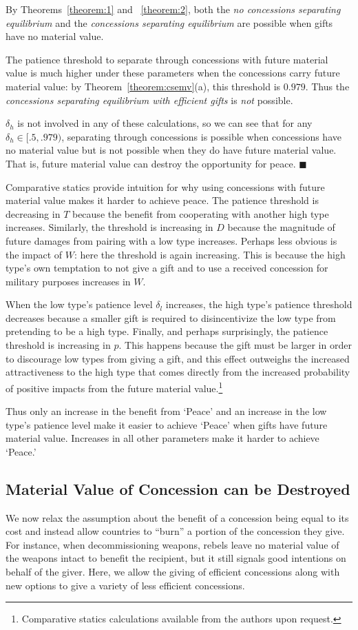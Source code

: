 \documentclass[12pt, letterpaper]{article}
\newcommand{\de}{\delta}
\begin{document}
By Theorems~\ref{theorem:1} and ~\ref{theorem:2}, both the \emph{no concessions separating equilibrium} and the \emph{concessions separating equilibrium} are possible when gifts have no material value.

The patience threshold to separate through concessions with future material value is much higher under these parameters when the concessions carry future material value: by Theorem~\ref{theorem:csemv}(a), this threshold is $0.979$. Thus the \emph{concessions separating equilibrium with efficient gifts} is \emph{not} possible. 

$\de_h$ is not involved in any of these calculations, so we can see that for any $\de_h \in [.5,.979)$, separating through concessions is possible when concessions have no material value but is not possible when they do have future material value. That is, future material value can destroy the opportunity for peace. \hfill $\blacksquare$ 

Comparative statics provide intuition for why using concessions with future material value makes it harder to achieve peace. The patience threshold is decreasing in $T$ because the benefit from cooperating with another high type increases. Similarly, the threshold is increasing in $D$ because the magnitude of future damages from pairing with a low type increases. Perhaps less obvious is the impact of $W$: here the threshold is again increasing. This is because the high type's own temptation to not give a gift and to use a received concession for military purposes increases in $W$.

When the low type's patience level $\de_l$ increases, the high type's patience threshold decreases because a smaller gift is required to disincentivize the low type from pretending to be a high type. Finally, and perhaps surprisingly, the patience threshold is increasing in $p$. This happens because the gift must be larger in order to discourage low types from giving a gift, and this effect outweighs the increased attractiveness to the high type that comes directly from the increased probability of positive impacts from the future material value.\footnote{Comparative statics calculations available from the authors upon request.} 

Thus only an increase in the benefit from `Peace' and an increase in the low type's patience level make it easier to achieve `Peace' when gifts have future material value. Increases in all other parameters make it harder to achieve `Peace.'
 
\subsection{Material Value of Concession can be Destroyed}
\label{sec:matval}
We now relax the assumption about the benefit of a concession being equal to its cost and instead allow countries to ``burn'' a portion of the concession they give. For instance, when decommissioning weapons, rebels leave no material value of the weapons intact to benefit the recipient, but it still signals good intentions on behalf of the giver. Here, we allow the giving of efficient concessions along with new options to give a variety of less efficient concessions. 
\end{document}
